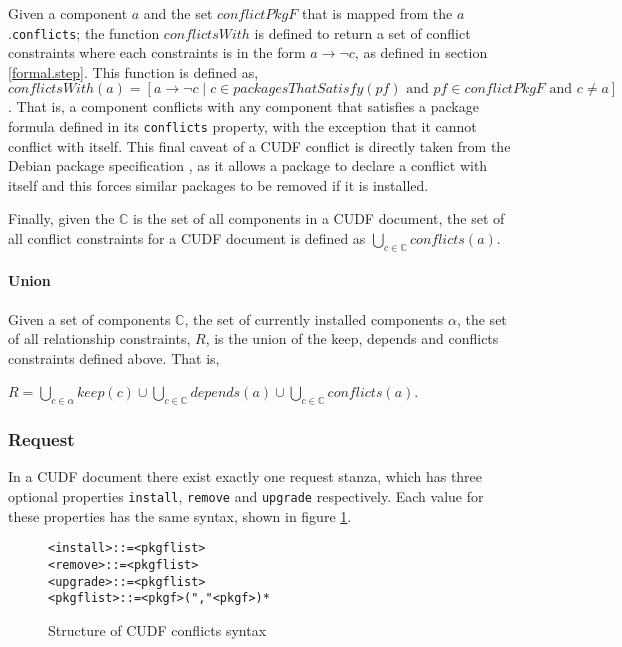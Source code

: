Given a component $a$ and the set $conflictPkgF$ that is mapped from the $a$.\verb+conflicts+;
the function $conflictsWith$ is defined to return a set of conflict constraints where each constraints is in the form $a \rightarrow \neg c$, as defined in section \ref{formal.step}.
This function is defined as, 
$conflictsWith(a) = [a \rightarrow \neg c \mid c \in packagesThatSatisfy(pf) \mbox{ and } pf \in conflictPkgF \mbox { and } c \not = a]$.
That is, a component conflicts with any component that satisfies a package formula defined in its \verb+conflicts+ property,
with the exception that it cannot conflict with itself.
This final caveat of a CUDF conflict is directly taken from the Debian package specification \citep{Barth2005}, 
as it allows a package to declare a conflict with itself and this forces similar packages to be removed if it is installed.  

Finally, given the $\mathbb{C}$ is the set of all components in a CUDF document,
the set of all conflict constraints for a CUDF document is defined as $\bigcup \limits_{c\in \mathbb{C}} conflicts(a)$.

\paragraph{Union}
Given a set of components $\mathbb{C}$, the set of currently installed components $\alpha$, 
the set of all relationship constraints, $R$, is the union of the keep, depends and conflicts constraints defined above.
That is, 
\begin{defs}
$R = \bigcup \limits_{c \in \alpha} keep(c) \cup \bigcup \limits_{c\in \mathbb{C}} depends(a) \cup \bigcup \limits_{c\in \mathbb{C}} conflicts(a)$.
\end{defs}

\subsubsection{Request}
\label{formal.cudf.request}
In a CUDF document there exist exactly one request stanza, which has three optional properties \verb+install+, \verb+remove+ and \verb+upgrade+ respectively.
Each value for these properties has the same syntax, shown in figure \ref{formal.requestssyntax}.

\begin{figure}[htp] 
\begin{center}
\begin{alltt}
<install> ::= <pkgflist>
<remove> ::= <pkgflist>
<upgrade> ::= <pkgflist>
<pkgflist> ::= <pkgf> ("," <pkgf>)*
\end{alltt}
  \caption[CUDF Package conflicts syntax]{Structure of CUDF conflicts syntax}
  \label{formal.requestssyntax}
\end{center}
\end{figure}

